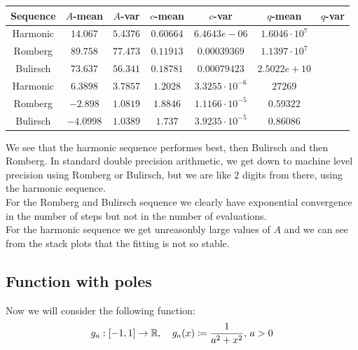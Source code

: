 \begin{table}[H]
    \centering
    \small
    \begin{tabular}{c||c|c|c|c|c}
Sequence & \(A\)-mean & \(A\)-var & \(c\)-mean & \(c\)-var & \(q\)-mean & \(q\)-var\\\hline
{}
Harmonic & \(14.067\) & \(5.4376\) & \(0.60664\) & \(6.4643e-06\) & \(1.6046\cdot 10^7\) \\
Romberg & \(89.758\) & \(77.473\) & \(0.11913\) & \(0.00039369\) & \(1.1397\cdot 10^7\) \\
Bulirsch & \(73.637\) & \(56.341\) & \(0.18781\) & \(0.00079423\) & \(2.5022e+10\) \\
Harmonic & \(6.3898\) & \(3.7857\) & \(1.2028\) & \(3.3255\cdot 10^{-6}\) & \(27269\) \\
Romberg & \(-2.898\) & \(1.0819\) & \(1.8846\) & \(1.1166\cdot 10^{-5}\) & \(0.59322\) \\
Bulirsch & \(-4.0998\) & \(1.0389\) & \(1.737\) & \(3.9235\cdot 10^{-5}\) & \(0.86086\) \\
    \end{tabular}
    \label{tab:my_label}
\end{table}

We see that the harmonic sequence performes best, then Bulirsch and then Romberg. In standard double precision arithmetic, we get down to machine level precision using Romberg or Bulirsch, but we are like \(2\) digits from there, using the harmonic sequence.\\

For the Romberg and Bulirsch sequence we clearly have exponential convergence in the number of steps but not in the number of evaluations.\\

For the harmonic sequence we get unreasonbly large values of \(A\) and we can see from the stack plots that the fitting is not so stable.\\

\subsection{Function with poles}

Now we will consider the following function:
\[
g_a: [-1, 1] \rightarrow \mathbb{R}, \quad g_a(x) \coloneqq \frac{1}{a^2 + x^2},\, a > 0
\]

